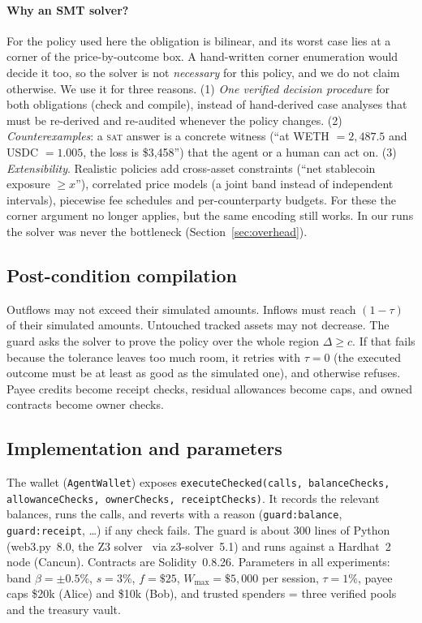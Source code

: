\documentclass[11pt]{article}
\begin{document}
\paragraph{Why an SMT solver?} For the policy used here the obligation is bilinear, and its worst case lies at a corner of the price-by-outcome box. A hand-written corner enumeration would decide it too, so the solver is not \emph{necessary} for this policy, and we do not claim otherwise. We use it for three reasons. (1) \emph{One verified decision procedure} for both obligations (check and compile), instead of hand-derived case analyses that must be re-derived and re-audited whenever the policy changes. (2) \emph{Counterexamples}: a \textsc{sat} answer is a concrete witness (``at WETH $=2{,}487.5$ and USDC $=1.005$, the loss is \$3{,}458'') that the agent or a human can act on. (3) \emph{Extensibility}. Realistic policies add cross-asset constraints (``net stablecoin exposure $\ge x$''), correlated price models (a joint band instead of independent intervals), piecewise fee schedules and per-counterparty budgets. For these the corner argument no longer applies, but the same encoding still works. In our runs the solver was never the bottleneck (Section~\ref{sec:overhead}).

\subsection{Post-condition compilation}
Outflows may not exceed their simulated amounts. Inflows must reach $(1-\tau)$ of their simulated amounts. Untouched tracked assets may not decrease. The guard asks the solver to prove the policy over the whole region $\Delta\ge c$. If that fails because the tolerance leaves too much room, it retries with $\tau=0$ (the executed outcome must be at least as good as the simulated one), and otherwise refuses. Payee credits become receipt checks, residual allowances become caps, and owned contracts become owner checks.

\subsection{Implementation and parameters}
The wallet (\texttt{AgentWallet}) exposes \texttt{executeChecked(calls, balanceChecks, allowanceChecks, ownerChecks, receiptChecks)}. It records the relevant balances, runs the calls, and reverts with a reason (\texttt{guard:balance}, \texttt{guard:receipt}, \ldots) if any check fails. The guard is about 300 lines of Python (web3.py~8.0, the Z3 solver~\cite{demoura2008z3} via z3-solver~5.1) and runs against a Hardhat~2 node (Cancun). Contracts are Solidity~0.8.26. Parameters in all experiments: band $\beta=\pm0.5\%$, $s=3\%$, $f=\$25$, $W_{\max}=\$5{,}000$ per session, $\tau=1\%$, payee caps \$20k (Alice) and \$10k (Bob), and trusted spenders = three verified pools and the treasury vault.
\end{document}
